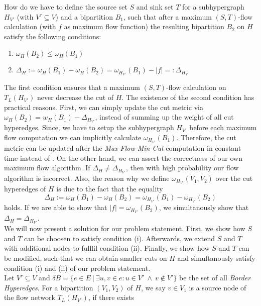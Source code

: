 \begin{problem}
\label{prob:ST}
How do we have to define the source set $S$ and sink set $T$ for a subhypergraph $H_{V'}$ 
(with $V' \subseteq V$) and a bipartition $B_1$, such that 
after a maximum $(S,T)$-flow calculation (with $f$ as maximum flow function)
the resulting bipartition $B_2$ on $H$ satisfy the following conditions:
\begin{enumerate}
\item $\omega_H(B_2) \le \omega_H(B_1)$
\item $\Delta_{H} := \omega_H(B_1) - \omega_H(B_2) = \omega_{H_{V'}}(B_1) - |f| =: \Delta_{H_{V'}}$
\end{enumerate}
\end{problem}

The first condition ensures that a maximum $(S,T)$-flow calculation on $T_L(H_{V'})$ never 
decrease the cut of $H$. The existence of the second condition has practical reasons. First, we
can simply update the cut metric via $\omega_H(B_2) = w_H(B_1) - \Delta_{H_{V'}}$,
instead of summing up the weight of all cut hyperedges. Since, we have to setup the subhypergraph
$H_{V'}$ before each maximum flow computation we can implicitly calculate $\omega_{H_{V'}}(B_1)$.
Therefore, the cut metric can be updated after the \emph{Max-Flow-Min-Cut} computation
in constant time instead of . On the other hand, we can assert the correctness of
our own maximum flow algorithm. If $\Delta_H \neq \Delta_{H_{V'}}$, then with high probability our
flow algorithm is incorrect. Also, the reason why we define $\omega_{H_{V'}}(V_1,V_2)$ over
the cut hyperedges of $H$ is due to the fact that the equality
\[\Delta_{H} := \omega_H(B_1) - \omega_H(B_2) = \omega_{H_{V'}}(B_1) - \omega_{H_{V'}}(B_2)\]
holds. If we are able to show that $|f| = \omega_{H_{V'}}(B_2)$, we simultanously show
that $\Delta_H = \Delta_{H_{V'}}$.\\
We will now present a solution for our problem statement. First, we show how $S$ and $T$
can be choosen to satisfy condition (i). Afterwards, we extend $S$ and $T$ with additional
nodes to fullfil condition (ii). Finally, we show how $S$ and $T$ can be modified, such that
we can obtain smaller cuts on $H$ and simultanously satisfy condition (i) and (ii) of our problem
statement. \\
Let $V' \subseteq V$ and $\delta B = \{ e \in E\ |\ \exists u,v \in e: u \in V'\ \land\ v \notin V' \}$
be the set of all \emph{Border Hyperedges}. For a bipartition $(V_1,V_2)$ of $H$, we say
$v \in V_1$ is a source node of the flow network $T_L(H_{V'})$, if there exists

